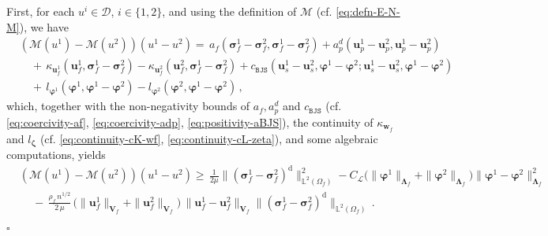 \documentclass[11pt]{article}
\numberwithin{equation}{section}
\newcommand{\bLambda}{{\boldsymbol\Lambda}}
\newcommand{\bsi}{{\boldsymbol\sigma}}
\newcommand{\bvarphi}{{\boldsymbol\varphi}}
\newcommand{\bzeta}{{\boldsymbol\zeta}}
\newcommand{\bw}{{\mathbf{w}}}
\newcommand{\bu}{\mathbf{u}}
\newcommand{\bt}{{\mathbf{t}}}
\newcommand{\0}{{\mathbf{0}}}
\def\bV{\mathbf{V}}
\newcommand{\bL}{\mathbf{L}}
\newcommand\bbL{\mathbb{L}}
\newcommand{\cM}{\mathcal{M}}
\newcommand{\cL}{\mathcal{L}}
\newcommand{\cD}{\mathcal{D}}
\def\L{\mathrm{L}}
\def\rd{\mathrm{d}}
\def\BJS{\mathtt{BJS}}
\newenvironment{proof}{\noindent{\it Proof.}}{\hfill$\square$}
\numberwithin{equation}{section}
\begin{document}
\begin{proof}
First, for each $u^i \in \cD$, $i\in \{1,2\}$, and using the definition of $\cM$ (cf. \eqref{eq:defn-E-N-M}), we have
\begin{align*}
&(\cM(u^1)-\cM(u^2))(u^1-u^2) =  \,  a_f(\bsi^1_f-\bsi^2_f,\bsi^1_f-\bsi^2_f) +  a^d_p(\bu_p^1-\bu_p^2,\bu_p^1-\bu_p^2) \nonumber\\ 
& \quad +\, \kappa_{\bu_f^1}(\bu_f^1, \bsi^1_f-\bsi^2_f)
- \kappa_{\bu_f^2}(\bu_f^2, \bsi^1_f-\bsi^2_f) + c_{\BJS}(\bu_s^1-\bu_s^2,\bvarphi^1-\bvarphi^2;\bu_s^1-\bu_s^2,\bvarphi^1-\bvarphi^2) \nonumber\\ 
& \quad +\, l_{\bvarphi^1}(\bvarphi^1,\bvarphi^1-\bvarphi^2)
- l_{\bvarphi^2}(\bvarphi^2,\bvarphi^1-\bvarphi^2)\,,
\end{align*}
which, together with the non-negativity bounds of $a_f, a^d_p$ and $c_\BJS$ (cf. \eqref{eq:coercivity-af}, \eqref{eq:coercivity-adp}, \eqref{eq:positivity-aBJS}), 
the continuity of $\kappa_{\bw_f}$ and $l_{\bzeta}$ (cf. \eqref{eq:continuity-cK-wf}, \eqref{eq:continuity-cL-zeta}), and some algebraic computations, yields
\begin{align}
&(\cM(u^1)-\cM(u^2))(u^1-u^2)\geq \, \frac{1}{2 \mu} \|(\bsi^1_f -\bsi^2_f)^\rd\|^2_{\bbL^2(\Omega_f)}-C_{\cL}\big(\|\bvarphi^1\|_{\bLambda_f}+\|\bvarphi^2\|_{\bLambda_f}\big)\|\bvarphi^1-\bvarphi^2\|^2_{\bLambda_f} \nonumber\\ 
& \quad\,-\,\frac{\rho_f\,n^{1/2}}{2\,\mu}\,\big(\|\bu_f^1\|_{\bV_f} + \|\bu_f^2\|_{\bV_f}\big)\,\|\bu_f^1 - \bu_f^2\|_{\bV_f} \|(\bsi^1_f - \bsi^2_f)^\rd\|_{\bbL^2(\Omega_f)}\,.
\label{eq:mono f bound1}
\end{align}

\end{proof}
\end{document}
